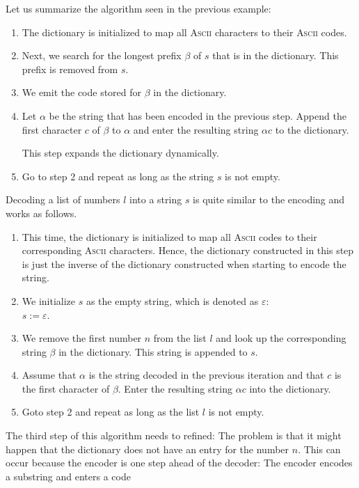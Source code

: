 Let us summarize the algorithm seen in the previous example:
\begin{enumerate}
\item The dictionary is initialized to map all \textsc{Ascii} characters to their \textsc{Ascii} codes.
\item Next, we search for the longest prefix $\beta$ of $s$ that is in the dictionary.  This prefix
      is removed from $s$.
\item We emit the code stored for $\beta$ in the dictionary.
\item Let $\alpha$ be the string that has been encoded in the previous step.  Append the first
      character $c$ of $\beta$ to $\alpha$ and enter the resulting string $\alpha c$ to the
      dictionary.

      This step expands the dictionary dynamically.
\item Go to step 2 and repeat as long as the string $s$ is not empty.
\end{enumerate}
Decoding a list of numbers $l$ into a string $s$ is quite similar to the encoding and works as follows.
\begin{enumerate}
\item This time, the dictionary is initialized to map all \textsc{Ascii} codes to their corresponding
      \textsc{Ascii} characters.  Hence, the dictionary constructed in this step is just the inverse
      of the dictionary constructed when starting to encode the string.
\item We initialize $s$ as the 
      empty string, which is denoted as $\varepsilon$:
      \\[0.2cm]
      \hspace*{1.3cm}
      $s := \varepsilon$.
\item We remove the first number $n$ from the list $l$ and look up the corresponding
      string $\beta$ in the dictionary.  This string is appended to $s$.
\item Assume that $\alpha$ is the string decoded in the previous iteration and that $c$ is the first
      character of $\beta$.  Enter the resulting string $\alpha c$ into the dictionary.
\item Goto step 2 and repeat as long as the list $l$ is not empty.
\end{enumerate}
The third step of this algorithm needs to refined:  The problem is
that it might happen that the dictionary does not have an entry for the number $n$.  This can occur because
the encoder is one step ahead of the decoder: The encoder encodes a substring and enters a code
